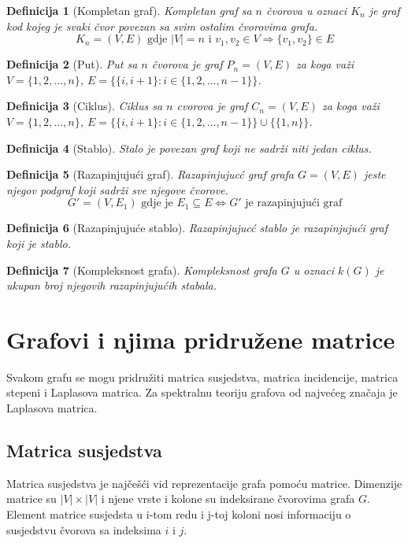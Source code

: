 \documentclass[11pt]{article}
\newtheorem{definition}{Definicija}
\begin{document}
		\begin{definition}[Kompletan graf]
		Kompletan graf sa $n$ čvorova u oznaci $K_n$ je graf kod kojeg je svaki čvor povezan sa svim ostalim čvorovima grafa. 
		\[ 
			K_n = (V,E) \text{ gdje } |V| = n \text{ i } v_1,v_2 \in V \Rightarrow \{v_1,v_2\} \in E
		\]
		\end{definition}
		
		\begin{definition}[Put]
		Put sa $n$ čvorova je graf $P_n=(V,E)$ za koga važi $V = \{1,2, \dots ,n\}$, $E = \{\{i, i+1\} : i \in \{1,2, \dots , n-1\}\}$.
		\end{definition}
		
		\begin{definition}[Ciklus]
		Ciklus sa $n$ cvorova je graf $C_n=(V,E)$ za koga važi $V = \{1,2, \dots ,n\}$, $E = \{\{i, i+1\} : i \in \{1,2, \dots , n-1\} \} \cup \{\{1,n\}\}$.
		\end{definition}
	
		\begin{definition}[Stablo]
		Stalo je povezan graf koji ne sadrži niti jedan ciklus.
		\end{definition}
	
		\begin{definition}[Razapinjujući graf]
		Razapinjujucć graf grafa $G = (V,E)$ jeste njegov podgraf koji sadrži sve njegove čvorove.
		\[
			G' = (V, E_1) \text{ gdje je } E_1 \subseteq E \Leftrightarrow G' \text{ je razapinjujući graf} 
		\]
		\end{definition}
	
		\begin{definition}[Razapinjujuće stablo]
		Razapinjujucć stablo je razapinjujući graf koji je stablo.
		\end{definition}
	
		\begin{definition}[Kompleksnost grafa]
		Kompleksnost grafa $G$ u oznaci $k(G)$ je ukupan broj njegovih razapinjujućih stabala. 
		\end{definition}
	
	\section{Grafovi i njima pridružene matrice}
	Svakom grafu se mogu pridružiti matrica susjedstva, matrica incidencije, matrica stepeni i Laplasova matrica.
	Za spektralnu teoriju grafova od najvećeg značaja je Laplasova matrica.
	
		\subsection{Matrica susjedstva}
		Matrica susjedstva je najčešći vid reprezentacije grafa pomoću matrice. 
		Dimenzije matrice su $|V| \times |V|$ i njene vrste i kolone su indeksirane čvorovima grafa $G$.  
		Element matrice susjedsta u i-tom redu i j-toj koloni nosi informaciju o susjedstvu čvorova sa indeksima $i$ i $j$.
	
\end{document}
